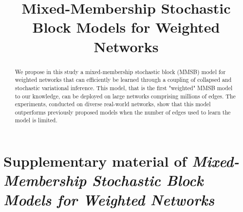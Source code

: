 \documentclass[letterpaper]{article}
\begin{document}
\title{Mixed-Membership Stochastic Block Models for Weighted Networks}
	
\maketitle

\begin{abstract}
We propose in this study a mixed-membership stochastic block (MMSB) model for weighted networks that can efficiently be learned through a coupling of collapsed and stochastic variational inference. This model, that is the first "weighted" MMSB model to our knowledge, can be deployed on large networks comprising millions of edges. The experiments, conducted on diverse real-world networks, show that this model outperforms previously proposed models when the number of edges used to learn the model is limited.
\end{abstract}









\clearpage

%



\clearpage
\appendix
\section{Supplementary material of \textit{Mixed-Membership Stochastic Block Models for Weighted Networks}}

\end{document}
